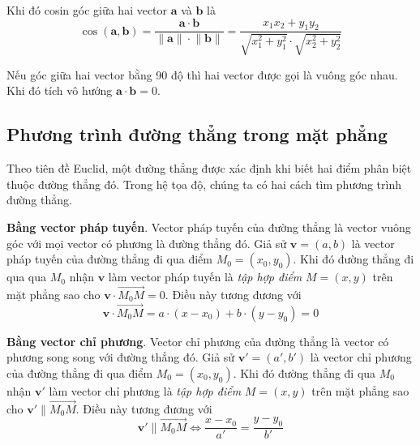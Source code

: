 Khi đó cosin góc giữa hai vector $\bm{a}$ và $\bm{b}$ là
\begin{equation}
	\cos (\bm{a}, \bm{b}) = \frac{\bm{a} \cdot \bm{b}}{\lVert \bm{a} \rVert \cdot \lVert \bm{b} \rVert} = \frac{x_1 x_2 + y_1 y_2}{\sqrt{x_1^2 + y_1^2} \cdot \sqrt{x_2^2 + y_2^2}}
\end{equation}

Nếu góc giữa hai vector bằng 90 độ thì hai vector được gọi là vuông góc nhau. Khi đó tích vô hướng $\bm{a} \cdot \bm{b} = 0$.

\subsection*{Phương trình đường thẳng trong mặt phẳng}

Theo tiên đề Euclid, một đường thẳng được xác định khi biết hai điểm phân biệt thuộc đường thẳng đó. Trong hệ tọa độ, chúng ta có hai cách tìm phương trình đường thẳng.

\textbf{Bằng vector pháp tuyến}. Vector pháp tuyến của đường thẳng là vector vuông góc với mọi vector có phương là đường thẳng đó. Giả sử $\bm{v} = (a, b)$ là vector pháp tuyến của đường thẳng đi qua điểm $M_0 = (x_0, y_0)$. Khi đó đường thẳng đi qua qua $M_0$ nhận $\bm{v}$ làm vector pháp tuyến là \textit{tập hợp điểm} $M = (x, y)$ trên mặt phẳng sao cho $\bm{v} \cdot \overrightarrow{M_0 M} = 0$. Điều này tương đương với
\begin{equation}
	\bm{v} \cdot \overrightarrow{M_0 M} = a \cdot (x - x_0) + b \cdot (y - y_0) = 0
\end{equation}

\textbf{Bằng vector chỉ phương}. Vector chỉ phương của đường thẳng là vector có phương song song với đường thẳng đó. Giả sử $\bm{v}' = (a', b')$ là vector chỉ phương của đường thẳng đi qua điểm $M_0 = (x_0, y_0)$. Khi đó đường thẳng đi qua $M_0$ nhận $\bm{v}'$ làm vector chỉ phương là \textit{tập hợp điểm} $M = (x, y)$ trên mặt phẳng sao cho $\bm{v}' \parallel \overrightarrow{M_0 M}$. Điều này tương đương với
\begin{equation}
	\bm{v}' \parallel \overrightarrow{M_0 M} \Leftrightarrow \frac{x - x_0}{a'} = \frac{y - y_0}{b'}
\end{equation}

